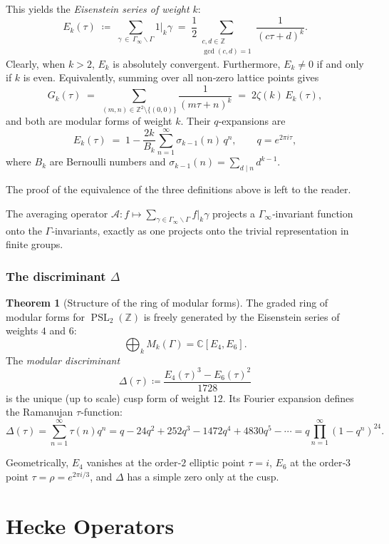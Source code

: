 \documentclass[10pt, a4paper]{article}
\newcommand{\C}{\mathbb{C}}
\newcommand{\Z}{\mathbb{Z}}
\newcommand{\PSL}{\operatorname{PSL}_2(\Z)}
\theoremstyle{definition}
\newtheorem{theorem}{Theorem}[section]
\theoremstyle{remark}
\begin{document}
This yields the \emph{Eisenstein series of weight $k$}:
\[
E_k(\tau) \;\coloneqq\; \sum_{\gamma\,\in\,\Gamma_\infty\backslash\Gamma} 1\big|_k\gamma
        \;=\; \frac{1}{2}\!\!\sum_{\substack{c,d\in\Z\\ \gcd(c,d)=1}} \frac{1}{(c\tau+d)^k}.
\]
Clearly, when $k > 2$, $E_k$ is absolutely convergent. Furthermore, $E_k \not = 0$ if and only if $k$ is even.  
Equivalently, summing over all non‑zero lattice points gives
\[
G_k(\tau) \;=\; \sum_{(m,n)\in\Z^2\setminus\{(0,0)\}} \frac{1}{(m\tau+n)^k}
        \;=\; 2\zeta(k)\,E_k(\tau),
\]
and both are modular forms of weight $k$.
Their $q$‑expansions are
\[
E_k(\tau) \;=\; 1 - \frac{2k}{B_k}\sum_{n=1}^\infty \sigma_{k-1}(n)\,q^n,
\qquad q=e^{2\pi i\tau},
\]
where $B_k$ are Bernoulli numbers and $\sigma_{k-1}(n)=\sum_{d\mid n}d^{k-1}$.


The proof of the equivalence of the three definitions above is left to the reader.


The averaging operator $\mathcal{A}: f \mapsto \sum_{\gamma\in\Gamma_\infty\backslash\Gamma} f|_k\gamma$ projects a $\Gamma_\infty$‑invariant function onto the $\Gamma$‑invariants, exactly as one projects onto the trivial representation in finite groups.

\subsubsection{The discriminant $\Delta$}


\begin{theorem}[Structure of the ring of modular forms]\cite{Apostol1990}
The graded ring of modular forms for $\PSL$ is freely generated by the Eisenstein series of weights $4$ and $6$:
\[
\bigoplus_{k} M_k(\Gamma) = \C[E_4, E_6].
\]
The \emph{modular discriminant}
\[
\Delta(\tau) \coloneqq \frac{E_4(\tau)^3 - E_6(\tau)^2}{1728}
\]
is the unique (up to scale) cusp form of weight $12$. Its Fourier expansion defines the Ramanujan $\tau$‑function:
\[
\Delta(\tau) = \sum_{n=1}^\infty \tau(n) q^n = q - 24q^2 + 252q^3 - 1472q^4 + 4830q^5 - \cdots = q\prod_{n=1}^\infty (1-q^n)^{24}.
\]
\end{theorem}

Geometrically, $E_4$ vanishes at the order‑$2$ elliptic point $\tau=i$, $E_6$ at the order‑$3$ point $\tau=\rho = e^{2\pi i/3}$, and $\Delta$ has a simple zero only at the cusp.


\section{Hecke Operators}
\end{document}
